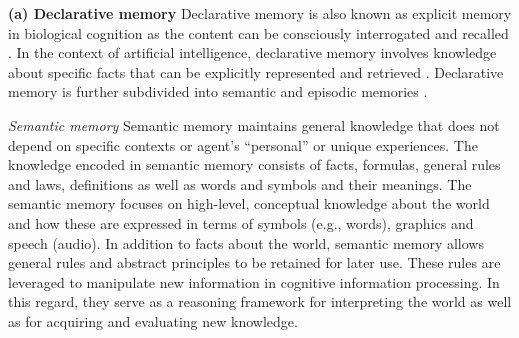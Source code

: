 \documentclass[10pt,journal,compsoc]{IEEEtran}
\begin{document}
\begin{table}[h!]
{\begin{tabular}{@{}llll@{}}
				&                                                                                                                                                                                                                                                                                                                                                                                   &                                                                                                                                                                                                                                                                                                                                                 &                                                                      \\ \bottomrule
			\end{tabular}
	
	} %
	\end{table}
	
	\textbf{(a) Declarative memory}
	Declarative memory is also known as explicit memory in biological cognition as the content can be consciously interrogated and recalled \cite{eichenbaum1997declarative,eichenbaum1999hippocampus}. In the context of artificial intelligence, declarative memory involves knowledge about specific facts that can be explicitly represented and retrieved \cite{wang2024memory}. Declarative memory is further subdivided into semantic and episodic memories \cite{tulving1998episodic}.  
	
	\textit{Semantic memory}
	Semantic memory maintains general knowledge that does not depend on specific contexts or agent’s “personal” or unique experiences.  The knowledge encoded in semantic memory consists of facts, formulas, general rules and laws, definitions as well as words and symbols and their meanings. The semantic memory focuses on high-level, conceptual knowledge about the world and how these are expressed in terms of symbols (e.g., words), graphics and speech (audio). In addition to facts about the world, semantic memory allows general rules and abstract principles to be retained for later use.  These rules are leveraged to manipulate new information in cognitive information processing. In this regard, they serve as a reasoning framework for interpreting the world as well as for acquiring and evaluating new knowledge.
	
\end{document}
